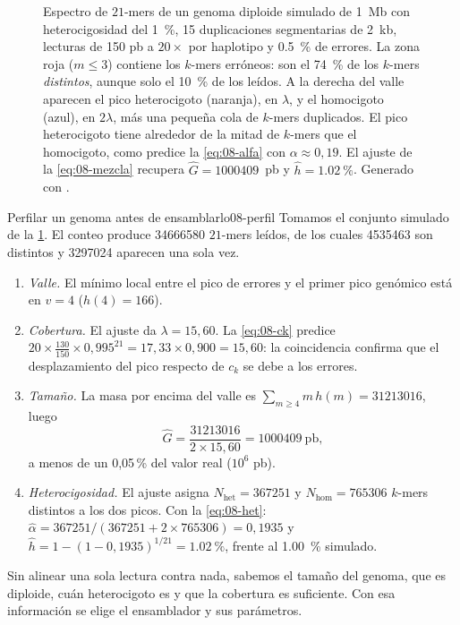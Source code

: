 \begin{figure}[t]
\caption[Espectro de $k$-mers de un diploide simulado]{Espectro de $21$-mers de un genoma diploide simulado de \SI{1}{Mb} con heterocigosidad del \SI{1}{\percent}, 15 duplicaciones segmentarias de \SI{2}{kb}, lecturas de 150 pb a $20\times$ por haplotipo y \SI{0,5}{\percent} de errores. La zona roja ($m\le3$) contiene los $k$-mers erróneos: son el \SI{74}{\percent} de los $k$-mers \emph{distintos}, aunque solo el \SI{10}{\percent} de los leídos. A la derecha del valle aparecen el pico heterocigoto (naranja), en $\lambda$, y el homocigoto (azul), en $2\lambda$, más una pequeña cola de $k$-mers duplicados. El pico heterocigoto tiene alrededor de la mitad de $k$-mers que el homocigoto, como predice la \cref{eq:08-alfa} con $\alpha\approx0{,}19$. El ajuste de la \cref{eq:08-mezcla} recupera $\widehat{G}=\num{1000409}$~pb y $\widehat{h}=\SI{1,02}{\percent}$. Generado con .}
\label{fig:08-espectro}
\end{figure}

\begin{ejemplo}{Perfilar un genoma antes de ensamblarlo}{08-perfil}
Tomamos el conjunto simulado de la \cref{fig:08-espectro}. El conteo produce \num{34666580} $21$-mers leídos, de los cuales \num{4535463} son distintos y \num{3297024} aparecen una sola vez.
\begin{enumerate}
  \item \emph{Valle.} El mínimo local entre el pico de errores y el primer pico genómico está en $v=4$ ($h(4)=166$).
  \item \emph{Cobertura.} El ajuste da $\lambda=15{,}60$. La \cref{eq:08-ck} predice $20\times\frac{130}{150}\times0{,}995^{21}=17{,}33\times0{,}900=15{,}60$: la coincidencia confirma que el desplazamiento del pico respecto de $c_k$ se debe a los errores.
  \item \emph{Tamaño.} La masa por encima del valle es $\sum_{m\ge4} m\,h(m)=\num{31213016}$, luego
  \[
  \widehat{G} = \frac{\num{31213016}}{2\times15{,}60} = \num{1000409}\ \text{pb},
  \]
  a menos de un 0{,}05\,\% del valor real ($10^6$ pb).
  \item \emph{Heterocigosidad.} El ajuste asigna $N_{\text{het}}=\num{367251}$ y $N_{\text{hom}}=\num{765306}$ $k$-mers distintos a los dos picos. Con la \cref{eq:08-het}: $\widehat{\alpha}=\num{367251}/(\num{367251}+2\times\num{765306})=0{,}1935$ y $\widehat{h}=1-(1-0{,}1935)^{1/21}=\SI{1,02}{\percent}$, frente al \SI{1,00}{\percent} simulado.
\end{enumerate}
Sin alinear una sola lectura contra nada, sabemos el tamaño del genoma, que es diploide, cuán heterocigoto es y que la cobertura es suficiente. Con esa información se elige el ensamblador y sus parámetros.
\end{ejemplo}

